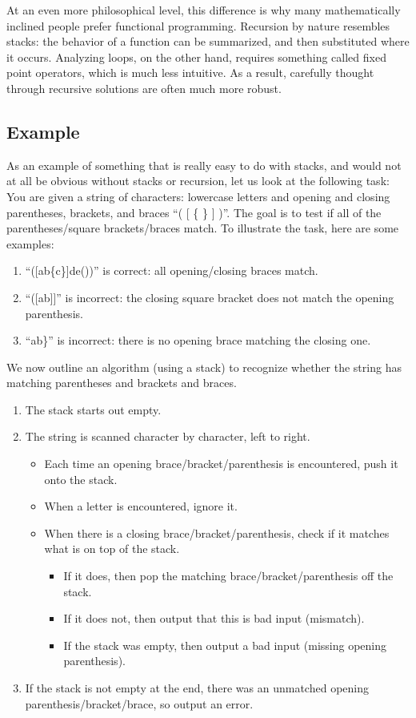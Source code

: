 At an even more philosophical level, this difference is why many
mathematically inclined people prefer functional programming.
Recursion by nature resembles stacks: the behavior of a function can
be summarized, and then substituted where it occurs.
Analyzing  loops, on the other hand, requires something
called fixed point operators, which is much less intuitive.
As a result, carefully thought through recursive solutions are often
much more robust.

\subsection{Example}
As an example of something that is really easy to do with stacks, and
would not at all be obvious without stacks or recursion, let us look at
the following task:
You are given a string of characters: 
lowercase letters and opening and closing parentheses, brackets, and
braces ``( [ \{ \} ] )''. 
The goal is to test if all of the parentheses/square brackets/braces match.
To illustrate the task, here are some examples:
\begin{enumerate}
\item ``([ab\{c\}]de())'' is correct: all opening/closing
  braces match.
\item ``([ab]]'' is incorrect: the closing square bracket does not
  match the opening parenthesis.
\item ``ab\}'' is incorrect: there is no opening brace matching the
  closing one.
\end{enumerate}
		
We now outline an algorithm (using a stack) to recognize whether the
string has matching parentheses and brackets and braces.

\begin{enumerate}
\item The stack starts out empty.
\item The string is scanned character by character, left to right.
\begin{itemize}
\item Each time an opening brace/bracket/parenthesis is encountered,
  push it onto the stack.
\item When a letter is encountered, ignore it.
\item When there is a closing brace/bracket/parenthesis, 
check if it matches what is on top of the stack. 
\begin{itemize}
\item If it does, then pop the matching brace/bracket/parenthesis off the
stack. 
\item If it does not, then output that this is bad input (mismatch).
\item If the stack was empty, then output a bad input (missing opening
  parenthesis).
\end{itemize}
\end{itemize}
\item If the stack is not empty at the end, there was an unmatched
  opening parenthesis/bracket/brace, so output an error.
\end{enumerate}

